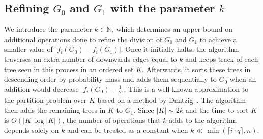 \documentclass{IEEEtran}
\begin{document}
\subsection{Refining $G_0$ and $G_1$ with the parameter $k$}
We introduce the parameter $k \in \mathbb{N}$, which determines an upper
bound on additional operations done to refine the division of $G_0$ and
$G_1$ to achieve a smaller value of $|f_i(G_0)-f_i(G_1)|$. Once it
initially halts, the algorithm
traverses an extra number of downwards edges equal to $k$ and keeps track of each
tree seen in this process in an ordered set $K$.
Afterwards, it sorts these trees in descending order
by probability mass and adds them sequentially to $G_0$ when an addition would
decrease $|f_i(G_0)-\frac{1}{2}|$. This is a well-known approximation to the
partition problem over $K$ based on a method by
Dantzig~\cite{knapsackapprox}. The algorithm
then adds the remaining trees in $K$
to $G_1$. Since $|K|\sim 2k$ and the time to sort $K$ is $O(|K|\log|K|)$, the
number of operations that $k$ adds to the algorithm depends solely on $k$ and
can be treated as a constant when $k \ll \min(\lceil i\cdot q \rceil,n)$.
\end{document}
